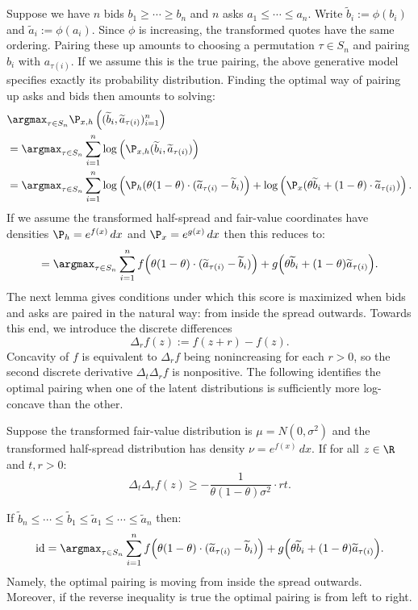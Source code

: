 Suppose we have $n$ bids $b_1 \geq \cdots \geq b_n$ and $n$ asks $a_1 \leq \cdots \leq a_n$. Write $\widetilde b_i:=\phi(b_i)$ and $\widetilde a_i:=\phi(a_i)$. Since $\phi$ is increasing, the transformed quotes have the same ordering. Pairing these up amounts to choosing a permutation $\tau \in S_n$ and pairing $b_i$ with $a_{\tau(i)}$. If we assume this is the true pairing, the above generative model specifies exactly its probability distribution. Finding the optimal way of pairing up asks and bids then amounts to solving:
%
\begin{align*}
    & \argmax_{\tau \in S_n} \P_{x,h}\left((\widetilde b_i, \widetilde a_{\tau(i)})_{i=1}^n\right) \\
    & = \argmax_{\tau \in S_n} \sum_{i=1}^n \log\left(\P_{x,h}(\widetilde b_i, \widetilde a_{\tau(i)})\right) \\
    & = \argmax_{\tau \in S_n} \sum_{i=1}^n \log\left(\P_h(\theta (1-\theta) \cdot (\widetilde a_{\tau(i)} - \widetilde b_i)\right) + \log\left( \P_x(\theta \widetilde b_i + (1-\theta) \cdot \widetilde a_{\tau(i)})\right).
\end{align*}
%
\noindent If we assume the transformed half-spread and fair-value coordinates have densities $\P_h=e^{f(x)}\,dx$ and $\P_x=e^{g(x)}\,dx$ then this reduces to:
%
\[= \argmax_{\tau \in S_n} \sum_{i=1}^n f\Big(\theta(1-\theta) \cdot (\widetilde a_{\tau(i)} - \widetilde b_i) \Big ) + g\Big(\theta \widetilde b_i + (1-\theta) \widetilde a_{\tau(i)}\Big). \]
%
\noindent The next lemma gives conditions under which this score is maximized
when bids and asks are paired in the natural way: from inside the spread
outwards. Towards this end, we introduce the discrete differences
%
\[\Delta_r f(z) := f(z + r) - f(z).\]
%
\noindent Concavity of $f$ is equivalent to $\Delta_r f$ being nonincreasing for
each $r > 0$, so the second discrete derivative $\Delta_t \Delta_r f$ is
nonpositive. The following identifies the optimal pairing when one of the latent
distributions is sufficiently more log-concave than the other.

\begin{lemma}
    Suppose the transformed fair-value distribution is $\mu=N(0,\sigma^2)$ and the transformed half-spread distribution has density $\nu=e^{f(x)}\,dx$. If for all $z \in \R$
    and $t,r > 0$:
    \begin{equation}
         \Delta_t \Delta_r f(z) \geq - \frac{1}{\theta(1-\theta)\sigma^2} \cdot rt.
         \label{eqn:gaussian_concavity_condition}
    \end{equation}

    \noindent If $\widetilde b_n \leq \cdots \leq \widetilde b_1 \leq \widetilde a_1 \leq \cdots \leq \widetilde a_n$ then:
    \[\mathrm{id} = \argmax_{\tau \in S_n} \sum_{i=1}^n f\Big(\theta(1-\theta) \cdot (\widetilde a_{\tau(i)} - \widetilde b_i) \Big ) + g\Big(\theta \widetilde b_i + (1-\theta) \widetilde a_{\tau(i)}\Big). \]
    \noindent Namely, the optimal pairing is moving from inside the spread outwards.
     Moreover, if the reverse inequality is true the optimal pairing is from left to
     right.

    \label{lem:optimal_pairing_bids_and_asks_gaussian}
\end{lemma}

